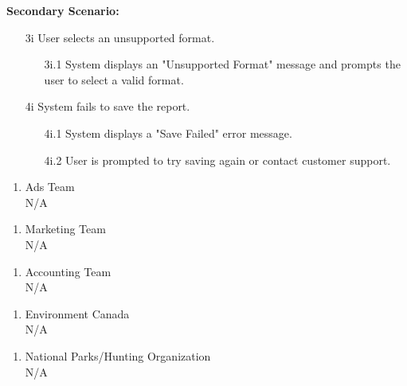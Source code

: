 \documentclass[]{article}
\begin{document}
\begin{enumerate}[{\bf BE1.}]
\begin{enumerate}[{\bf VP1.}]
            \textbf{Secondary Scenario:}
            \begin{enumerate}
                \item[3i] User selects an unsupported format.
                \begin{enumerate}
                    \item[3i.1] System displays an "Unsupported Format" message and prompts the user to select a valid format.
                \end{enumerate}
                \item[4i] System fails to save the report.
                \begin{enumerate}
                    \item[4i.1] System displays a "Save Failed" error message.
                    \item[4i.2] User is prompted to try saving again or contact customer support.
                \end{enumerate}
            \end{enumerate}
    \end{enumerate}

    \begin{enumerate}[{\bf VP2.}]
        \item Ads Team \\ 
        N/A
    \end{enumerate}

    \begin{enumerate}[{\bf VP3.}]
        \item Marketing Team \\
        N/A
    \end{enumerate}

    \begin{enumerate}[{\bf VP4.}]
        \item Accounting Team \\
        N/A
    \end{enumerate}

    \begin{enumerate}[{\bf VP5.}]
        \item Environment Canada \\
        N/A
    \end{enumerate}

    \begin{enumerate}[{\bf VP6.}]
        \item National Parks/Hunting Organization \\
        N/A
    \end{enumerate}



\end{enumerate}
\end{document}
